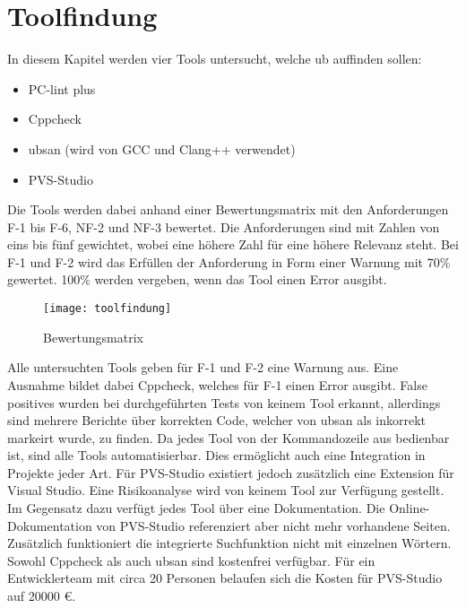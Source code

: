 \chapter{Toolfindung}
\label{ch:toolfindung}

In diesem Kapitel werden vier Tools untersucht, welche \gls{ub} auffinden sollen:
\begin{itemize}
    \item PC-lint plus
    \item Cppcheck
    \item \gls{ubsan} (wird von GCC und Clang++ verwendet)
    \item PVS-Studio
\end{itemize}
Die Tools werden dabei anhand einer Bewertungsmatrix mit den Anforderungen F-1 bis F-6, NF-2 und NF-3 bewertet. Die Anforderungen sind mit Zahlen von eins bis fünf gewichtet, wobei 
eine höhere Zahl für eine höhere Relevanz steht. Bei F-1 und F-2 wird das Erfüllen der Anforderung in Form einer Warnung mit 70\% gewertet. 100\% werden vergeben, wenn das Tool einen 
Error ausgibt.
\begin{figure}[htpb]
    \centering
    \texttt{[image: toolfindung]}
    \caption{Bewertungsmatrix}
    \label{img:toolfindung}
\end{figure}

Alle untersuchten Tools geben für F-1 und F-2 eine Warnung aus. Eine Ausnahme bildet dabei Cppcheck, welches für F-1 einen Error ausgibt. \newline
False positives wurden bei durchgeführten Tests von keinem Tool erkannt, allerdings sind mehrere Berichte über korrekten Code, welcher von \gls{ubsan} als inkorrekt markeirt wurde, 
zu finden. \newline
Da jedes Tool von der Kommandozeile aus bedienbar ist, sind alle Tools automatisierbar. Dies ermöglicht auch eine Integration in Projekte jeder Art. Für PVS-Studio existiert jedoch 
zusätzlich eine Extension für Visual Studio. \newline
Eine Risikoanalyse wird von keinem Tool zur Verfügung gestellt. \newline
Im Gegensatz dazu verfügt jedes Tool über eine Dokumentation. Die Online-Dokumentation von PVS-Studio referenziert aber nicht mehr vorhandene Seiten. Zusätzlich funktioniert die 
integrierte Suchfunktion nicht mit einzelnen Wörtern. \newline
Sowohl Cppcheck als auch \gls{ubsan} sind kostenfrei verfügbar. Für ein Entwicklerteam mit circa 20 Personen belaufen sich die Kosten für PVS-Studio auf 20000 €.

